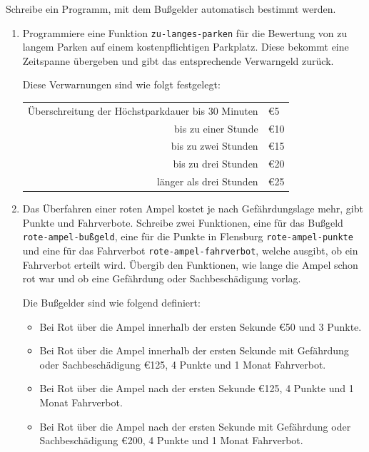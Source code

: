 \begin{aufgabe}
  Schreibe ein Programm, mit dem Bußgelder
  automatisch bestimmt werden.
  
  \begin{enumerate}
  \item Programmiere eine Funktion \lstinline{zu-langes-parken}
    für die Bewertung von zu langem Parken auf einem kostenpflichtigen
    Parkplatz. Diese bekommt eine Zeitspanne übergeben und gibt das 
    entsprechende Verwarngeld zurück.
    
    Diese Verwarnungen sind wie folgt festgelegt:
    \begin{flushleft}
      \begin{tabular}{rl}
    Überschreitung der Höchstparkdauer bis 30 Minuten & \euro{5}\\
    bis zu einer Stunde & \euro{10}\\
    bis zu zwei Stunden & \euro{15}\\
    bis zu drei Stunden & \euro{20}\\
    länger als drei Stunden &  \euro{25}
      \end{tabular}
    \end{flushleft}
    
  \item Das Überfahren einer roten Ampel kostet je nach
    Gefährdungslage mehr, gibt Punkte und Fahrverbote. Schreibe
    zwei Funktionen, eine für das Bußgeld \lstinline{rote-ampel-bußgeld}, 
    eine für die Punkte in Flensburg \lstinline{rote-ampel-punkte} 
    und eine für das Fahrverbot \lstinline{rote-ampel-fahrverbot}, 
    welche ausgibt, ob ein Fahrverbot erteilt wird. Übergib
    den Funktionen, wie lange die Ampel schon rot war und ob eine
    Gefährdung oder Sachbeschädigung vorlag.
    
    Die Bußgelder sind wie folgend definiert:
    \begin{itemize}
    \item Bei Rot über die Ampel innerhalb der ersten Sekunde			
      \euro{50} und 3 Punkte.
    \item Bei Rot über die Ampel innerhalb der ersten Sekunde mit
      Gefährdung oder Sachbeschädigung \euro{125}, 4 		
      Punkte und 1 Monat Fahrverbot.
    \item Bei Rot über die Ampel nach der ersten Sekunde \euro{125},
      4 Punkte und 1 Monat Fahrverbot.
    \item Bei Rot über die Ampel nach der ersten Sekunde mit
      Gefährdung oder Sachbeschädigung \euro{200}, 4
      Punkte und 1 Monat Fahrverbot.
    \end{itemize}
    
    
  \end{enumerate}
\end{aufgabe}


